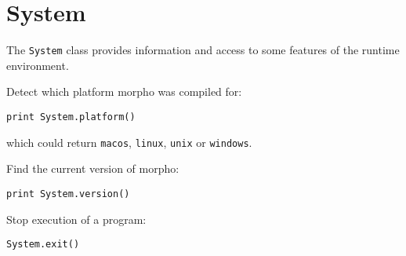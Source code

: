 \hypertarget{system}{%
\section{System}\label{system}}

The \texttt{System} class provides information and access to some
features of the runtime environment.

Detect which platform morpho was compiled for:

\begin{lstlisting}
print System.platform() 
\end{lstlisting}

which could return \texttt{macos}, \texttt{linux}, \texttt{unix} or
\texttt{windows}.

Find the current version of morpho:

\begin{lstlisting}
print System.version() 
\end{lstlisting}

Stop execution of a program:

\begin{lstlisting}
System.exit() 
\end{lstlisting}
